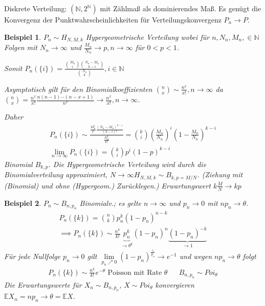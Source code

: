 \documentclass[]{article}
\newtheorem*{example}{Beispiel}
\begin{document}
Diskrete Verteilung: $(\mathbb{N}, 2^\mathbb{N})$ mit Zählmaß als dominierendes Maß. Es genügt die Konvergenz der Punktwahrscheinlichkeiten für Verteilungskonvergenz $P_n \rightarrow P$.

\begin{example}
	$P_n \sim H_{N,M,k}$ Hypergeometrische Verteilung wobei für $n, N_n, M_n, \in \mathbb{N}$ Folgen mit $N_n \rightarrow \infty$ und $\frac{M_n}{N_n} \rightarrow p, n\rightarrow\infty$ für $0 < p < 1$.
	
	Somit $P_n(\{i\}) = \frac{\binom{M_n}{i}\binom{N_n-M_n}{k-i}}{\binom{N_n}{k}}, i\in \mathbb{N}$
	
	Asymptotisch gilt für den Binomialkoeffizienten $\binom{n}{x} \sim \frac{n^x}{x!}, n\rightarrow\infty$ da $\binom{n}{x} = \frac{n^x}{x!} \frac{n(n-1)\cdots(n-x+1)}{n^x} \rightarrow \frac{n^x}{x!}, n\rightarrow\infty$.
	
	Daher
	\begin{align*}
		P_n(\{i\}) \sim \frac{\frac{M_n^i}{i!}\frac{(N_n-M_n)^{k-i}}{(k-i)!}}{\frac{N_n^k}{k!}} = \binom{k}{i} \left(\frac{M_n}{N_n}\right)^i \left(1-\frac{M_n}{N_n}\right)^{k-i}\\
		\lim\limits_{n\rightarrow\infty} P_n(\{i\}) = \binom{k}{i} p^i (1-p)^{k-i}
	\end{align*}
	Binomial $B_{k,p}$. Die Hypergeometrische Verteilung wird durch die Binomialverteilung approximiert, $N\rightarrow\infty H_{N,M,k}\sim B_{k,p=M/N}$. (Ziehung mit (Binomial) und ohne (Hypergeom.) Zurücklegen.) Erwartungswert $k\frac{M}{N} \rightarrow kp$
	
\end{example}

\begin{example}
	$P_n \sim B_{n,p_n}$ Binomialv.; es gelte $n\rightarrow \infty$ und $p_n\rightarrow 0$ mit $np_n\rightarrow \theta$.
	\begin{align*}
		P_n(\{k\}) = \binom{n}{k} p_n^k (1-p_n)^{n-k}\\
		\implies P_n(\{k\}) \sim \frac{n^k}{k!}\underbrace{p_n^k}_{\rightarrow\theta^k} (1-p_n)^{n}\underbrace{(1-p_n)^{-k}}_{\rightarrow1}
	\end{align*}
	Für jede Nullfolge $p_n\rightarrow0$ gilt $\lim\limits_{p_n\nearrow 0}(1-p_n)^{\frac{1}{p_n}}\rightarrow e^{-1}$ und wegen $np_n\rightarrow \theta$ folgt
	\begin{align*}
		P_n(\{k\})\sim \frac{n^k}{k!} e^{-\theta} \text{ Poisson mit Rate }\theta && B_{n,p_n} \sim Poi_\theta
	\end{align*}
	Die Erwartungswerte für $X_n\sim B_{n,p_n}$, $X\sim Poi_\theta$ konvergieren $\mathbb{E}X_n = np_n \rightarrow \theta = \mathbb{E}X$.
\end{example}
\end{document}
